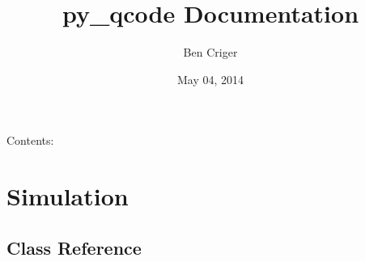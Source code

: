 \documentclass[letterpaper,10pt,english]{sphinxmanual}
\title{py_qcode Documentation}
\date{May 04, 2014}
\author{Ben Criger}
\begin{document}
\maketitle
\tableofcontents
{}\label{index::doc}


Contents:


\chapter{Simulation}
\label{simulation:py-qcode-decoding-topological-error-correcting-codes-in-python}\label{simulation::doc}\label{simulation:simulation}

\section{Class Reference}
\label{simulation:class-reference}
\end{document}
